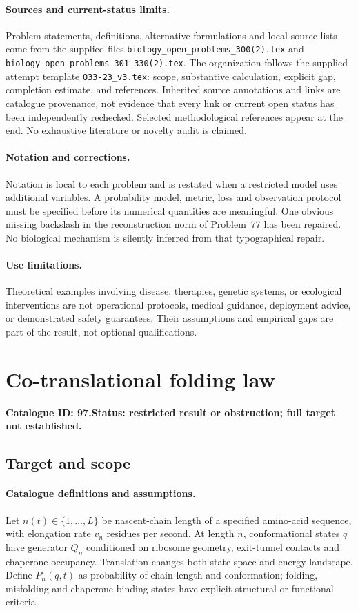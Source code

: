 \documentclass[11pt]{article}
\begin{document}
\paragraph{Sources and current-status limits.}
Problem statements, definitions, alternative formulations and local source lists
come from the supplied files
\texttt{biology\_open\_problems\_300(2).tex} and
\texttt{biology\_open\_problems\_301\_330(2).tex}.
The organization follows the supplied attempt template
\texttt{O33-23\_v3.tex}: scope, substantive calculation, explicit gap,
completion estimate, and references. Inherited source annotations and links are
catalogue provenance, not evidence that every link or current open status has
been independently rechecked. Selected methodological references appear at the
end. No exhaustive literature or novelty audit is claimed.

\paragraph{Notation and corrections.}
Notation is local to each problem and is restated when a restricted model uses
additional variables. A probability model, metric, loss and observation protocol
must be specified before its numerical quantities are meaningful. One obvious
missing backslash in the reconstruction norm of Problem~77 has been repaired.
No biological mechanism is silently inferred from that typographical repair.

\paragraph{Use limitations.}
Theoretical examples involving disease, therapies, genetic systems, or ecological
interventions are not operational protocols, medical guidance, deployment advice,
or demonstrated safety guarantees. Their assumptions and empirical gaps are part
of the result, not optional qualifications.

\setcounter{section}{96}
\section{Co-translational folding law}
\label{prob:097}
\noindent\textbf{Catalogue ID: 97.}\quad \textbf{Status: restricted result or obstruction; full target not established.}
\subsection{Target and scope}
\paragraph{Catalogue definitions and assumptions.}
Let $n(t)\in\{1,\ldots,L\}$ be nascent-chain length of a specified amino-acid sequence, with elongation rate $v_n$ residues per second. At length $n$, conformational states $q$ have generator $Q_n$ conditioned on ribosome geometry, exit-tunnel contacts and chaperone occupancy. Translation changes both state space and energy landscape. Define $P_n(q,t)$ as probability of chain length and conformation; folding, misfolding and chaperone binding states have explicit structural or functional criteria.
\end{document}
